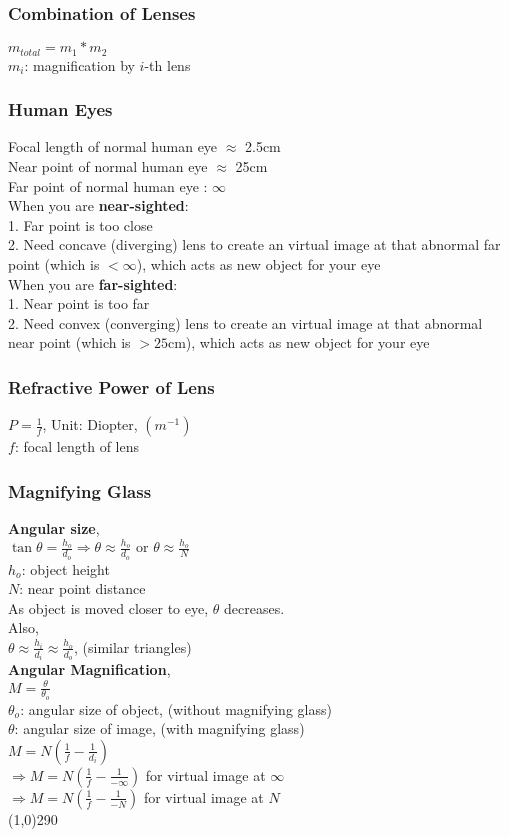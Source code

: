 \documentclass[10 pt]{article}
\begin{document}
\begin{multicols}{2}
\subsubsection*{Combination of Lenses}
$m_{total} = m_1 * m_2$ \\
$m_i$: magnification by $i$-th lens
\subsubsection*{Human Eyes}
Focal length of normal human eye $\approx$ 2.5cm \\
Near point of normal human eye $\approx$ 25cm \\
Far point of normal human eye : $\infty$ \\
When you are \textbf{near-sighted}: \\
1. Far point is too close \\
2. Need concave (diverging) lens to create an virtual image at that abnormal far point (which is $< \infty$), which acts as new object for your eye \\
When you are \textbf{far-sighted}: \\
1. Near point is too far \\
2. Need convex (converging) lens to create an virtual image at that abnormal near point (which is $> 25$cm), which acts as new object for your eye
\subsubsection*{Refractive Power of Lens}
$P = \frac{1}{f}$, Unit: Diopter, $(m^{-1})$ \\
$f$: focal length of lens
\subsubsection*{Magnifying Glass}
\textbf{Angular size}, \\
$\tan{\theta} = \frac{h_o}{d_o} \Rightarrow \theta \approx \frac{h_o}{d_o} \textrm{ or } \theta \approx \frac{h_o}{N}$ \\
$h_o$: object height \\
$N$: near point distance \\
As object is moved closer to eye, $\theta$ decreases. \\
Also, \\
$\theta \approx \frac{h_i}{d_i} \approx \frac{h_o}{d_o}$, (similar triangles) \\
\textbf{Angular Magnification}, \\
$M = \frac{\theta}{\theta_o}$ \\
$\theta_o$: angular size of object, (without magnifying glass) \\
$\theta$: angular size of image, (with magnifying glass) \\
$M = N(\frac{1}{f} - \frac{1}{d_i})$ \\
$\Rightarrow M = N(\frac{1}{f} - \frac{1}{-\infty})$ for virtual image at $\infty$ \\
$\Rightarrow M = N(\frac{1}{f} - \frac{1}{-N})$ for virtual image at $N$ \\
\line(1,0){290}


\end{multicols}
\end{document}
